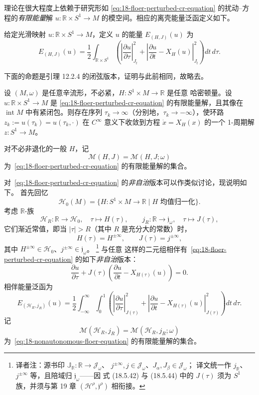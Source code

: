 \personFloer{}理论在很大程度上依赖于研究形如
\eqref{eq:18-floer-perturbed-cr-equation} 的扰动\personCauchy{}--\personRiemann{}方程的\emph{有限能量}解
$u:\mathbb R\times S^1\to M$ 的模空间。相应的离壳能量泛函定义如下。

\begin{definition}[能量]
\label{def:18-floer-energy}
给定光滑映射 $u:\mathbb R\times S^1\to M$，定义 $u$ 的能量
$E_{(H,J)}(u)$ 为
\[
 E_{(H,J)}(u)=\frac12\int_{\mathbb R\times S^1}
 \left(\left|\frac{\partial u}{\partial\tau}\right|_{J_t}^2
 +\left|\frac{\partial u}{\partial t}-X_H(u)\right|_{J_t}^2\right)
 dt\,d\tau.
\]
\end{definition}

下面的命题是引理 12.2.4 的闭弦版本，证明与此前相同，故略去。

\begin{proposition}
\label{prop:18-finite-energy-asymptotic-subsequence}
设 $(M,\omega)$ 是任意辛流形，不必紧，$H:S^1\times M\to\mathbb R$ 是任意
哈密顿量。设 $u:\mathbb R\times S^1\to M$ 是
\eqref{eq:18-floer-perturbed-cr-equation} 的有限能量解，且其像在 $\operatorname{int}M$
中有紧闭包。则存在序列 $\tau_k\to\infty$（分别地，$\tau_k\to-\infty$），使环路
$z_k:=u(\tau_k)=u(\tau_k,\cdot)$ 在 $C^\infty$ 意义下收敛到\personHamilton{}方程
$\dot x=X_H(x)$ 的一个 1-周期解 $z:S^1\to M$。
\end{proposition}

对不必非退化的一般 $H$，记
\[
 \mathcal M(H,J)=\mathcal M(H,J;\omega)
\]
为~\eqref{eq:18-floer-perturbed-cr-equation} 的有限能量解的集合。

对~\eqref{eq:18-floer-perturbed-cr-equation} 的\emph{非自治}版本可以作类似讨论，现说明如下。
首先回忆
\[
 \mathcal H_0(M)=\{H:S^1\times M\to\mathbb R\mid H\text{ 均值归一化}\}.
\]
考虑 $\mathbb R$-族
\[
 \mathcal H_R:\mathbb R\to\mathcal H_0,\quad\tau\mapsto H(\tau),
 \qquad
 j_R:\mathbb R\to\mathfrak j_\omega,\quad\tau\mapsto J(\tau),
\]
它们渐近常值，即当 $|\tau|>R$（其中 $R$ 是充分大的常数）时，
\[
 H(\tau)=H^{\pm\infty},\qquad J(\tau)=j^{\pm\infty},
\]
其中 $H^{\pm\infty}\in\mathcal H_0$、$j^{\pm\infty}\in\mathfrak j_\omega$。
\footnote{译者注：源书印 $\mathbb J_\mathbb R\colon\mathbb R\to\mathcal J_\omega$、
$j^{\pm\infty},j\in\mathcal J_\omega$、$J_\alpha,J_\beta\in\mathcal J_\omega$；
译文统一作 $j_\mathbb R$、$j^{\pm\infty}$ 等，且陪域归 $\mathfrak j_\omega$——因
式 (18.5.42) 与 (18.5.44) 中的 $J(\tau)$ 须为 $S^1$ 族，并须与第 19 章
$(\mathcal H^\rho,\mathfrak j^\rho)$ 相衔接。}
与任意
这样的二元组相伴有~\eqref{eq:18-floer-perturbed-cr-equation} 的如下\emph{非自治}版本：
\begin{equation}
 \frac{\partial u}{\partial\tau}
 +J(\tau)\left(\frac{\partial u}{\partial t}-X_{H(\tau)}(u)\right)=0.
 \label{eq:18-nonautonomous-floer-equation}
\end{equation}
相伴能量泛函为
\[
 E_{(\mathcal H_R,j_R)}(u)=\frac12\int_{-\infty}^{\infty}\int_0^1
 \left(\left|\frac{\partial u}{\partial\tau}\right|_{J(\tau)}^2
 +\left|\frac{\partial u}{\partial t}-X_{H(\tau)}(u)\right|_{J(\tau)}^2\right)
 dt\,d\tau.
\]
记
\[
 \mathcal M(\mathcal H_R,j_R)=\mathcal M(\mathcal H_R,j_R;\omega)
\]
为~\eqref{eq:18-nonautonomous-floer-equation} 的有限能量解的集合。

